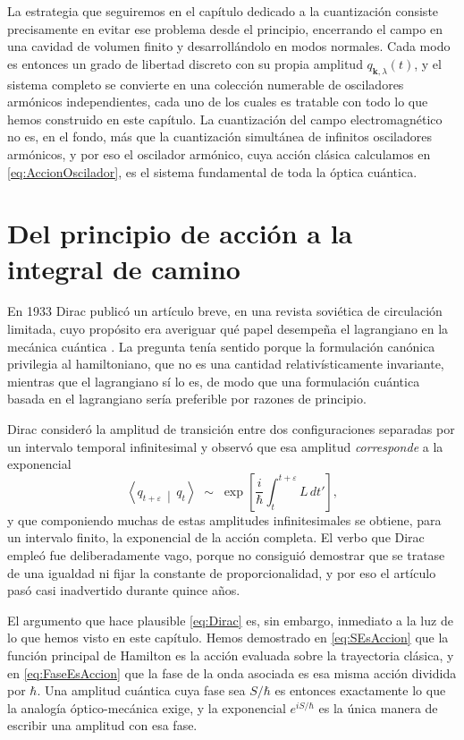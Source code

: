         La estrategia que seguiremos en el capítulo dedicado a la cuantización consiste precisamente en evitar ese problema desde el principio, encerrando el campo en una cavidad de volumen finito y desarrollándolo en modos normales. Cada modo es entonces un grado de libertad discreto con su propia amplitud $q_{\mathbf{k},\lambda}(t)$, y el sistema completo se convierte en una colección numerable de osciladores armónicos independientes, cada uno de los cuales es tratable con todo lo que hemos construido en este capítulo. La cuantización del campo electromagnético no es, en el fondo, más que la cuantización simultánea de infinitos osciladores armónicos, y por eso el oscilador armónico, cuya acción clásica calculamos en \eqref{eq:AccionOscilador}, es el sistema fundamental de toda la óptica cuántica.

\section{Del principio de acción a la integral de camino}

        En 1933 Dirac publicó un artículo breve, en una revista soviética de circulación limitada, cuyo propósito era averiguar qué papel desempeña el lagrangiano en la mecánica cuántica \citep{dirac1933lagrangian}. La pregunta tenía sentido porque la formulación canónica privilegia al hamiltoniano, que no es una cantidad relativísticamente invariante, mientras que el lagrangiano sí lo es, de modo que una formulación cuántica basada en el lagrangiano sería preferible por razones de principio.

        Dirac consideró la amplitud de transición entre dos configuraciones separadas por un intervalo temporal infinitesimal y observó que esa amplitud \textit{corresponde} a la exponencial
        \begin{equation}\label{eq:Dirac}
            \left\langle q_{t+\varepsilon}\,\middle|\,q_{t}\right\rangle \;\sim\; \exp\left[\frac{i}{\hbar}\int_{t}^{t+\varepsilon}L\,dt'\right],
        \end{equation}
        y que componiendo muchas de estas amplitudes infinitesimales se obtiene, para un intervalo finito, la exponencial de la acción completa. El verbo que Dirac empleó fue deliberadamente vago, porque no consiguió demostrar que se tratase de una igualdad ni fijar la constante de proporcionalidad, y por eso el artículo pasó casi inadvertido durante quince años.

        El argumento que hace plausible \eqref{eq:Dirac} es, sin embargo, inmediato a la luz de lo que hemos visto en este capítulo. Hemos demostrado en \eqref{eq:SEsAccion} que la función principal de Hamilton es la acción evaluada sobre la trayectoria clásica, y en \eqref{eq:FaseEsAccion} que la fase de la onda asociada es esa misma acción dividida por $\hbar$. Una amplitud cuántica cuya fase sea $S/\hbar$ es entonces exactamente lo que la analogía óptico-mecánica exige, y la exponencial $e^{iS/\hbar}$ es la única manera de escribir una amplitud con esa fase.

